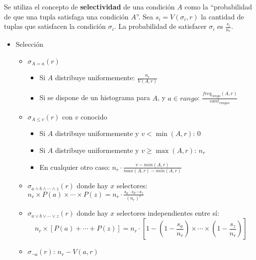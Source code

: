 \documentclass[a4paper, twoside]{article}
\begin{document}
Se utiliza el concepto de \textbf{selectividad} de una condición $A$ como la ``probabilidad de que una tupla satisfaga una condición $A$''. Sea $s_{i}=V(\sigma_{i},r)$ la cantidad de tuplas que satisfacen la condición $\sigma_{i}$. La probabilidad de satisfacer $\sigma_{i}$ es $\frac{s_{i}}{n_{r}}$.
\begin{itemize}
	\item Selección
	\begin{itemize}
		\item $\sigma_{A=a}(r)$
		\begin{itemize}
			\item Si $A$ distribuye uniformemente: $\frac{n_{r}}{V(A,r)}$
			\item Si se dispone de un histograma para $A$, y $a\in rango$: $\frac{freq_{rango}(A,r)}{cant_{rangos}}$
		\end{itemize}
		\item $\sigma_{A\leq v}(r)$ con $v$ conocido
		\begin{itemize}
			\item Si $A$ distribuye uniformemente y $v<\min(A,r)$: $0$
			\item Si $A$ distribuye uniformemente y $v\geq\max(A,r)$: $n_{r}$
			\item En cualquier otro caso: $n_{r}\cdot\frac{v-min(A,r)}{max(A,r)-min(A,r)}$
		\end{itemize}
		\item $\sigma_{a\wedge b\wedge\cdots\wedge z}(r)$ donde hay $x$ selectores: $n_{r}\times P(a)\times\cdots\times P(z)=n_{r}\cdot\frac{s_{a}\cdot s_{b}\cdots s_{z}}{\left(n_{r}\right)^{x}}$
		\item $\sigma_{a\lor b\lor\cdots\lor z}(r)$ donde hay $x$ selectores independientes entre sí: 
		\[
			n_{r}\times\left[P(a)+\cdots+P(z)\right]=n_{r}\cdot\left[1-\left(1-\frac{s_{a}}{n_{r}}\right)\times\cdots\times\left(1-\frac{s_{z}}{n_{r}}\right)\right]
		\]
		\item $\sigma_{\lnot a}(r)$: $n_{r}-V(a,r)$
	\end{itemize}


\end{itemize}
\end{document}
